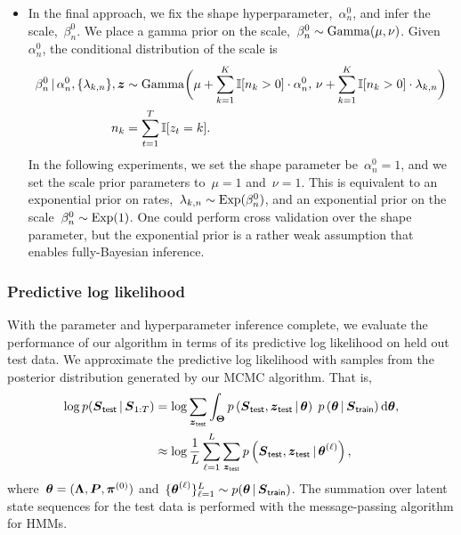 \begin{itemize}
\item In the final approach, we fix the shape
  hyperparameter,~$\alpha_n^0$, and infer the scale,~$\beta_n^0$.  We
  place a gamma prior on the scale,~$\beta_n^0 \sim \mathrm{Gamma}(\mu,
  \nu)$. Given~$\alpha_n^0$, the conditional distribution of the scale
  is
\begin{align*}
  \beta_n^0 \,|\, \alpha_n^0, \{\lambda_{k,n}\}, \boldsymbol{z}  
  &\sim \mathrm{Gamma}\bigg(
    \mu + \sum_{k=1}^K \mathbb{I}[n_k > 0] \cdot \alpha_n^0, \,
    \nu + \sum_{k=1}^K \mathbb{I}[n_k > 0] \cdot \lambda_{k,n} \bigg) \\
  n_k &= \sum_{t=1}^T \mathbb{I}[z_t=k].
\end{align*}
In the following experiments, we set the shape parameter
be~$\alpha_n^0=1$, and we set the scale prior parameters to~$\mu=1$
and~$\nu=1$.  This is equivalent to an exponential prior on
rates,~$\lambda_{k,n} \sim \mathrm{Exp}(\beta_n^0)$, and an
exponential prior on the scale~$\beta_n^0 \sim \mathrm{Exp}(1)$.
One could perform cross validation over the shape parameter, but the
exponential prior is a rather weak assumption that enables
fully-Bayesian inference.


\end{itemize}


\subsubsection{Predictive log likelihood}
With the parameter and hyperparameter inference complete, we evaluate
the performance of our algorithm in terms of its predictive log
likelihood on held out test data. We approximate the predictive log
likelihood with samples from the posterior distribution generated by
our MCMC algorithm. That is,
\begin{align*}
\log p(\boldsymbol{S}_{\mathsf{test}} \,|\, \boldsymbol{S}_{1:T}) &= \log \sum_{\boldsymbol{z}_{\mathsf{test}}} \int_{\boldsymbol{\Theta}} p\left(\boldsymbol{S}_{\mathsf{test}}, \boldsymbol{z}_{\mathsf{test}} \,|\, \boldsymbol{\theta} \right) \; p\left(\boldsymbol{\theta} \,|\, \boldsymbol{S}_{\mathsf{train}} \right) \mathrm{d}\boldsymbol{\theta}, \\
&\approx \log \frac{1}{L} \sum_{\ell=1}^L \sum_{\boldsymbol{z}_{\mathsf{test}}} p\left(\boldsymbol{S}_{\mathsf{test}},  \boldsymbol{z}_{\mathsf{test}} \,|\, \boldsymbol{\theta}^{(\ell)} \right),
\end{align*}
where~${\boldsymbol{\theta}=(\boldsymbol{\Lambda}, \boldsymbol{P}, \boldsymbol{\pi}^{(0)})}$ and~$\{\boldsymbol{\theta}^{(\ell)} \}_{\ell=1}^L
\sim p(\boldsymbol{\theta} \,|\, \boldsymbol{S}_{\mathsf{train}})$. The summation over latent state
sequences for the test data is performed with the message-passing
algorithm for HMMs.

